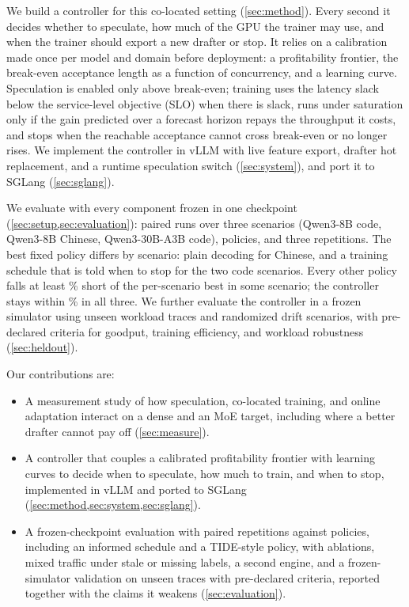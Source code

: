 We build a controller for this co-located setting (\cref{sec:method}). Every second it decides whether to speculate, how much of the GPU the trainer may use, and when the trainer should export a new drafter or stop. It relies on a calibration made once per model and domain before deployment: a profitability frontier, the break-even acceptance length as a function of concurrency, and a learning curve. Speculation is enabled only above break-even; training uses the latency slack below the service-level objective (SLO) when there is slack, runs under saturation only if the gain predicted over a forecast horizon repays the throughput it costs, and stops when the reachable acceptance cannot cross break-even or no longer rises. We implement the controller in vLLM \citep{kwon2023vllm} with live feature export, drafter hot replacement, and a runtime speculation switch (\cref{sec:system}), and port it to SGLang (\cref{sec:sglang}).

We evaluate with every component frozen in one checkpoint (\cref{sec:setup,sec:evaluation}):  paired runs over three scenarios (Qwen3-8B code, Qwen3-8B Chinese, Qwen3-30B-A3B code),  policies, and three repetitions. The best fixed policy differs by scenario: plain decoding for Chinese, and a training schedule that is told when to stop for the two code scenarios. Every other policy falls at least \% short of the per-scenario best in some scenario; the controller stays within \% in all three. 
We further evaluate the controller in a frozen simulator using unseen workload traces and randomized drift scenarios, with pre-declared criteria for goodput, training efficiency, and workload robustness (\cref{sec:heldout}).

Our contributions are:
\begin{itemize}
\item A measurement study of how speculation, co-located training, and online adaptation interact on a dense and an MoE target, including where a better drafter cannot pay off (\cref{sec:measure}).
\item A controller that couples a calibrated profitability frontier with learning curves to decide when to speculate, how much to train, and when to stop, implemented in vLLM and ported to SGLang (\cref{sec:method,sec:system,sec:sglang}).
\item A frozen-checkpoint evaluation with paired repetitions against  policies, including an informed schedule and a TIDE-style policy, with ablations, mixed traffic under stale or missing labels, a second engine, and a frozen-simulator validation on unseen traces with pre-declared criteria, reported together with the claims it weakens (\cref{sec:evaluation}).
\end{itemize}

